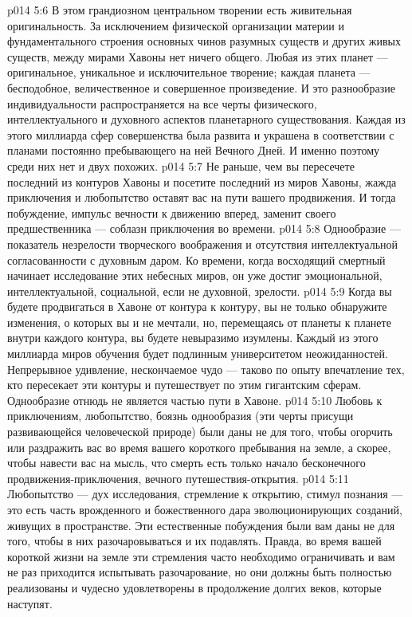 \vs p014 5:6 \pc В этом грандиозном центральном творении есть живительная оригинальность. За исключением физической организации материи и фундаментального строения основных чинов разумных существ и других живых существ, между мирами Хавоны нет ничего общего. Любая из этих планет --- оригинальное, уникальное и исключительное творение; каждая планета --- бесподобное, величественное и совершенное произведение. И это разнообразие индивидуальности распространяется на все черты физического, интеллектуального и духовного аспектов планетарного существования. Каждая из этого миллиарда сфер совершенства была развита и украшена в соответствии с планами постоянно пребывающего на ней Вечного Дней. И именно поэтому среди них нет и двух похожих.
\vs p014 5:7 Не раньше, чем вы пересечете последний из контуров Хавоны и посетите последний из миров Хавоны, жажда приключения и любопытство оставят вас на пути вашего продвижения. И тогда побуждение, импульс вечности к движению вперед, заменит своего предшественника --- соблазн приключения во времени.
\vs p014 5:8 Однообразие --- показатель незрелости творческого воображения и отсутствия интеллектуальной согласованности с духовным даром. Ко времени, когда восходящий смертный начинает исследование этих небесных миров, он уже достиг эмоциональной, интеллектуальной, социальной, если не духовной, зрелости.
\vs p014 5:9 Когда вы будете продвигаться в Хавоне от контура к контуру, вы не только обнаружите изменения, о которых вы и не мечтали, но, перемещаясь от планеты к планете внутри каждого контура, вы будете невыразимо изумлены. Каждый из этого миллиарда миров обучения будет подлинным университетом неожиданностей. Непрерывное удивление, нескончаемое чудо --- таково по опыту впечатление тех, кто пересекает эти контуры и путешествует по этим гигантским сферам. Однообразие отнюдь не является частью пути в Хавоне.
\vs p014 5:10 Любовь к приключениям, любопытство, боязнь однообразия (эти черты присущи развивающейся человеческой природе) были даны не для того, чтобы огорчить или раздражить вас во время вашего короткого пребывания на земле, а скорее, чтобы навести вас на мысль, что смерть есть только начало бесконечного продвижения\hyp{}приключения, вечного путешествия\hyp{}открытия.
\vs p014 5:11 Любопытство --- дух исследования, стремление к открытию, стимул познания --- это есть часть врожденного и божественного дара эволюционирующих созданий, живущих в пространстве. Эти естественные побуждения были вам даны не для того, чтобы в них разочаровываться и их подавлять. Правда, во время вашей короткой жизни на земле эти стремления часто необходимо ограничивать и вам не раз приходится испытывать разочарование, но они должны быть полностью реализованы и чудесно удовлетворены в продолжение долгих веков, которые наступят.

